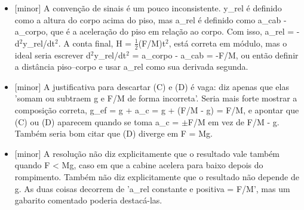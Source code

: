 \documentclass{article}%
\begin{document}
\begin{itemize}%
\item%
{[}minor{]} A convenção de sinais é um pouco inconsistente. y\_rel é definido como a altura do corpo acima do piso, mas a\_rel é definido como a\_cab - a\_corpo, que é a aceleração do piso em relação ao corpo. Com isso, a\_rel = -d$^2$y\_rel/dt$^2$. A conta final, H = $\frac12$(F/M)t$^2$, está correta em módulo, mas o ideal seria escrever d$^2$y\_rel/dt$^2$ = a\_corpo - a\_cab = -F/M, ou então definir a distância piso--corpo e usar a\_rel como sua derivada segunda.%
\item%
{[}minor{]} A justificativa para descartar (C) e (D) é vaga: diz apenas que elas 'somam ou subtraem g e F/M de forma incorreta'. Seria mais forte mostrar a composição correta, g\_ef = g + a\_c = g + (F/M - g) = F/M, e apontar que (C) ou (D) aparecem quando se toma a\_c = $\pm$F/M em vez de F/M - g. Também seria bom citar que (D) diverge em F = Mg.%
\item%
{[}minor{]} A resolução não diz explicitamente que o resultado vale também quando F < Mg, caso em que a cabine acelera para baixo depois do rompimento. Também não diz explicitamente que o resultado não depende de g. As duas coisas decorrem de 'a\_rel constante e positiva = F/M', mas um gabarito comentado poderia destacá{-}las.%
\end{itemize}%
\end{document}
